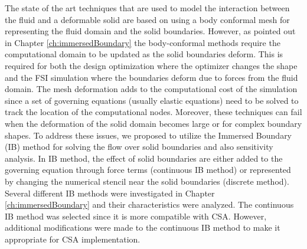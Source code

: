 The state of the art techniques that are used to model the interaction between the fluid and a deformable solid are based on using a body conformal mesh for representing the fluid domain and the solid boundaries. However, as pointed out in Chapter \ref{ch:immersedBoundary} the body-conformal methods require the computational domain to be updated as the solid boundaries deform. This is required for both the design optimization where the optimizer changes the shape and the FSI simulation where the boundaries deform due to forces from the fluid domain. The mesh deformation adds to the computational cost of the simulation since a set of governing equations (usually elastic equations) need to be solved to track the location of the computational nodes. Moreover, these techniques can fail when the deformation of the solid domain becomes large or for complex boundary shapes. To address these issues, we proposed to utilize the Immersed Boundary (IB) method for solving the flow over solid boundaries and also sensitivity analysis. In IB method, the effect of solid boundaries are either added to the governing equation through force terms (continuous IB method) or represented by changing the numerical stencil near the solid boundaries (discrete method). Several different IB methods were investigated in Chapter \ref{ch:immersedBoundary} and their characteristics were analyzed. The continuous IB method was selected since it is more compatible with CSA. However, additional modifications were made to the continuous IB method to make it appropriate for CSA implementation.

